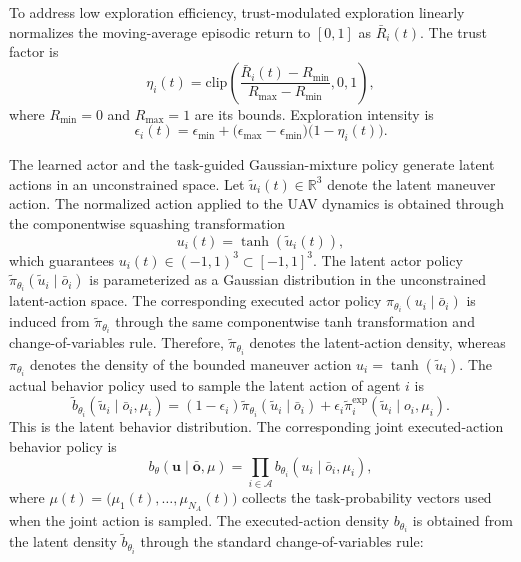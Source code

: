 \documentclass{cja}
\begin{document}
To address low exploration efficiency, trust-modulated exploration linearly normalizes the moving-average episodic return to $[0,1]$ as $\bar R_i(t)$. The trust factor is
\begin{equation}
\eta_i(t)
=
\mathrm{clip}
\left(
\frac{\bar R_i(t)-R_{\min}}{R_{\max}-R_{\min}},
0,1
\right),
\end{equation}
where $R_{\min}=0$ and $R_{\max}=1$ are its bounds. Exploration intensity is
\begin{equation}
\epsilon_i(t)
=
\epsilon_{\min}
+
\bigl(\epsilon_{\max}-\epsilon_{\min}\bigr)
\bigl(1-\eta_i(t)\bigr).
\end{equation}

The learned actor and the task-guided Gaussian-mixture policy generate latent actions in an unconstrained space. Let $\widetilde u_i(t)\in\mathbb R^3$ denote the latent maneuver action. The normalized action applied to the UAV dynamics is obtained through the componentwise squashing transformation
\begin{equation}
u_i(t)
=
\tanh\!\left(\widetilde u_i(t)\right),
\end{equation}
which guarantees $u_i(t)\in(-1,1)^3\subset[-1,1]^3$.
The latent actor policy $\widetilde\pi_{\theta_i}(\widetilde u_i\mid\bar o_i)$ is parameterized as a Gaussian distribution in the unconstrained latent-action space. The corresponding executed actor policy $\pi_{\theta_i}(u_i\mid\bar o_i)$ is induced from $\widetilde\pi_{\theta_i}$ through the same componentwise tanh transformation and change-of-variables rule. Therefore, $\widetilde\pi_{\theta_i}$ denotes the latent-action density, whereas $\pi_{\theta_i}$ denotes the density of the bounded maneuver action $u_i=\tanh(\widetilde u_i)$.
The actual behavior policy used to sample the latent action of agent $i$ is
\begin{equation}
\widetilde b_{\theta_i}(\widetilde u_i\mid\bar o_i,\mu_i)
=
(1-\epsilon_i)\widetilde\pi_{\theta_i}(\widetilde u_i\mid\bar o_i)
+\epsilon_i\widetilde\pi_i^{\mathrm{exp}}(\widetilde u_i\mid o_i,\mu_i).
\end{equation}
This is the latent behavior distribution.
The corresponding joint executed-action behavior policy is
\begin{equation}
b_\theta(\mathbf u\mid\bar{\mathbf o},\mu)
=
\prod_{i\in\mathcal A}b_{\theta_i}(u_i\mid\bar o_i,\mu_i),
\end{equation}
where $\mu(t)=\bigl(\mu_1(t),\ldots,\mu_{N_A}(t)\bigr)$ collects the task-probability vectors used when the joint action is sampled. The executed-action density $b_{\theta_i}$ is obtained from the latent density $\widetilde b_{\theta_i}$ through the standard change-of-variables rule:
\end{document}
